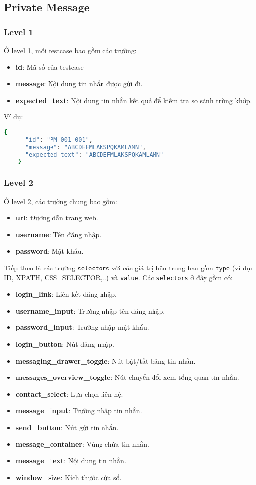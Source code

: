 \subsection{Private Message}
\subsubsection{Level 1}
Ở level 1, mỗi testcase bao gồm các trường:
\begin{itemize}
    \item \textbf{id}: Mã số của testcase
    \item \textbf{message}: Nội dung tin nhắn được gửi đi.
    \item \textbf{expected\_text}: Nội dung tin nhắn kết quả để kiếm tra so sánh trùng khớp.
\end{itemize}

\noindent Ví dụ:
\begin{lstlisting}[language=bash, caption={Ví dụ testcase PM-001-0001 ở level 1}]
    {
      "id": "PM-001-001",
      "message": "ABCDEFMLAKSPQKAMLAMN",
      "expected_text": "ABCDEFMLAKSPQKAMLAMN"
    }
\end{lstlisting}

\subsubsection{Level 2}
Ở level 2, các trường chung bao gồm:

\begin{itemize}
    \item \textbf{url}: Đường dẫn trang web.
    \item \textbf{username}: Tên đăng nhập.
    \item \textbf{password}: Mật khẩu.
\end{itemize}
Tiếp theo là các trường \texttt{selectors} với các giá trị bên trong bao gồm \texttt{type} (ví dụ: ID, XPATH, CSS\_SELECTOR,..) và \texttt{value}. Các \texttt{selectors} ở đây gồm có:
\begin{itemize}
    \item \textbf{login\_link}: Liên kết đăng nhập.
    \item \textbf{username\_input}: Trường nhập tên đăng nhập.
    \item \textbf{password\_input}: Trường nhập mật khẩu.
    \item \textbf{login\_button}: Nút đăng nhập.
    \item \textbf{messaging\_drawer\_toggle}: Nút bật/tắt bảng tin nhắn.
    \item \textbf{messages\_overview\_toggle}: Nút chuyển đổi xem tổng quan tin nhắn.
    \item \textbf{contact\_select}: Lựa chọn liên hệ.
    \item \textbf{message\_input}: Trường nhập tin nhắn.
    \item \textbf{send\_button}: Nút gửi tin nhắn.
    \item \textbf{message\_container}: Vùng chứa tin nhắn.
    \item \textbf{message\_text}: Nội dung tin nhắn.
    \item \textbf{window\_size}: Kích thước cửa sổ.
\end{itemize}

